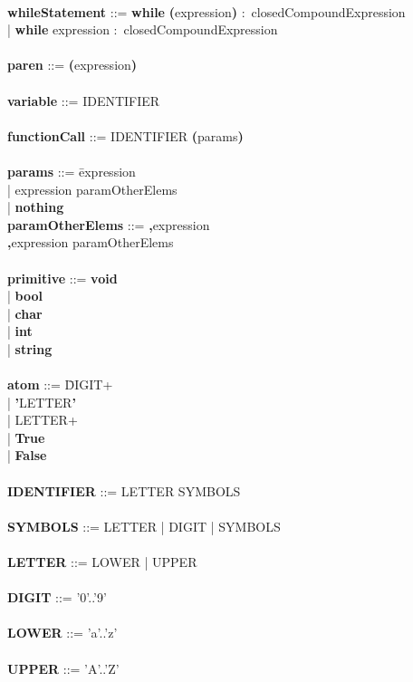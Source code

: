 \begin{tabbing}
\\
{\bf whileStatement}              ::= \=\textbf{while} \textbf{(}expression\textbf{)} $\colon$ closedCompoundExpression\\
                                      \>| \textbf{while} expression $\colon$ closedCompoundExpression\\
\\ 
{\bf paren}                       ::= \textbf{(}expression\textbf{)}\\
\\   
{\bf variable}                    ::= IDENTIFIER \\
\\   
{\bf functionCall}                ::= IDENTIFIER \textbf{(}params\textbf{)} \\
\\
{\bf params}                      ::= \=expression\\
                                      \>| expression paramOtherElems\\
                                      \>| \textbf{nothing}
\\
{\bf paramOtherElems}             ::= \=\textbf{,}expression\\
                                      \>\textbf{,}expression paramOtherElems\\
\\    
{\bf primitive}                   ::= \=\textbf{void}\\
                                      \>| \textbf{bool}\\
                                      \>| \textbf{char}\\
                                      \>| \textbf{int}\\
                                      \>| \textbf{string}\\
\\ 
{\bf atom}                        ::= \=DIGIT+\\
                                      \>| \textbf{'}LETTER\textbf{'}\\
                                      \>| LETTER+\\
                                      \>| \textbf{True}\\
                                      \>| \textbf{False}\\
\\
{\bf IDENTIFIER}                  ::= LETTER SYMBOLS\\
\\
{\bf SYMBOLS}                     ::= LETTER | DIGIT | SYMBOLS\\
\\
{\bf LETTER}                      ::= LOWER | UPPER\\
\\
{\bf DIGIT}                       ::= '0'..'9'\\
\\
{\bf LOWER}                       ::= 'a'..'z'\\
\\     
{\bf UPPER}                       ::= 'A'..'Z'\\
\\
\end{tabbing}
